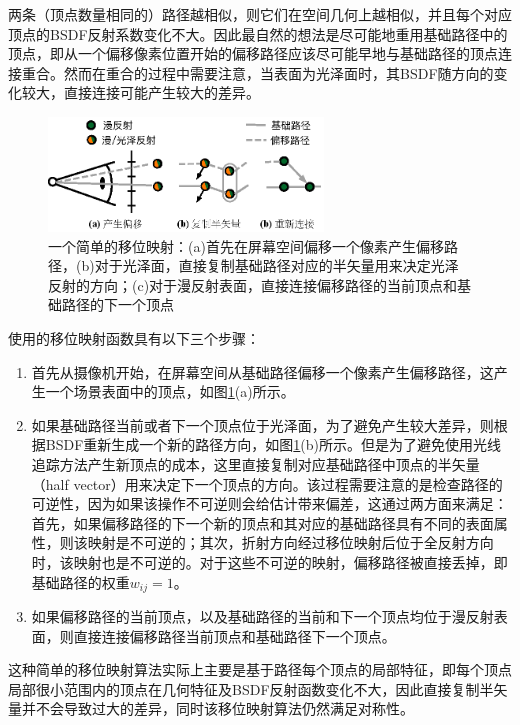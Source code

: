 两条（顶点数量相同的）路径越相似，则它们在空间几何上越相似，并且每个对应顶点的BSDF反射系数变化不大。因此最自然的想法是尽可能地重用基础路径中的顶点，即从一个偏移像素位置开始的偏移路径应该尽可能早地与基础路径的顶点连接重合。然而在重合的过程中需要注意，当表面为光泽面时，其BSDF随方向的变化较大，直接连接可能产生较大的差异。

\begin{figure}
	\sidecaption
	\includegraphics[width=0.65\textwidth]{figures/pt/copy-shift-mapping}
	\caption{一个简单的移位映射：(a)首先在屏幕空间偏移一个像素产生偏移路径，(b)对于光泽面，直接复制基础路径对应的半矢量用来决定光泽反射的方向；(c)对于漫反射表面，直接连接偏移路径的当前顶点和基础路径的下一个顶点}
	\label{f:pt-copy-shift-mapping}
\end{figure}

\cite{a:GradientDomainPathTracing}使用的移位映射函数具有以下三个步骤：

\begin{enumerate}
	\item 首先从摄像机开始，在屏幕空间从基础路径偏移一个像素产生偏移路径，这产生一个场景表面中的顶点，如图\ref{f:pt-copy-shift-mapping}(a)所示。
	\item 如果基础路径当前或者下一个顶点位于光泽面，为了避免产生较大差异，则根据BSDF重新生成一个新的路径方向，如图\ref{f:pt-copy-shift-mapping}(b)所示。但是为了避免使用光线追踪方法产生新顶点的成本，这里直接复制对应基础路径中顶点的半矢量（half vector）用来决定下一个顶点的方向。该过程需要注意的是检查路径的可逆性，因为如果该操作不可逆则会给估计带来偏差，这通过两方面来满足：首先，如果偏移路径的下一个新的顶点和其对应的基础路径具有不同的表面属性，则该映射是不可逆的；其次，折射方向经过移位映射后位于全反射方向时，该映射也是不可逆的。对于这些不可逆的映射，偏移路径被直接丢掉，即基础路径的权重$w_{ij}=1$。
	\item 如果偏移路径的当前顶点，以及基础路径的当前和下一个顶点均位于漫反射表面，则直接连接偏移路径当前顶点和基础路径下一个顶点。
\end{enumerate}

这种简单的移位映射算法实际上主要是基于路径每个顶点的局部特征，即每个顶点局部很小范围内的顶点在几何特征及BSDF反射函数变化不大，因此直接复制半矢量并不会导致过大的差异，同时该移位映射算法仍然满足对称性。



